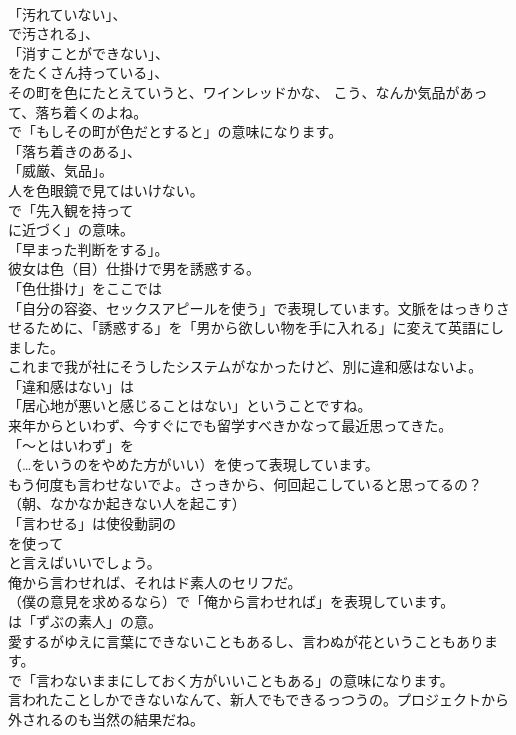 \documentclass[8pt]{extreport}
\begin{document}
\begin{CJK}{UTF8}{min}
\\	「汚れていない」、
\\	で汚される」、
\\	「消すことができない」、
\\	をたくさん持っている」、
\\	その町を色にたとえていうと、ワインレッドかな、 こう、なんか気品があって、落ち着くのよね。 
\\	で「もしその町が色だとすると」の意味になります。
\\	「落ち着きのある」、
\\	「威厳、気品」。	
\\	人を色眼鏡で見てはいけない。 
\\	で「先入観を持って 
\\	に近づく」の意味。
\\	「早まった判断をする」。	
\\	彼女は色（目）仕掛けで男を誘惑する。 
\\	「色仕掛け」をここでは
\\	「自分の容姿、セックスアピールを使う」で表現しています。文脈をはっきりさせるために、「誘惑する」を「男から欲しい物を手に入れる」に変えて英語にしました。	
\\	これまで我が社にそうしたシステムがなかったけど、別に違和感はないよ。 
\\	「違和感はない」は
\\	「居心地が悪いと感じることはない」ということですね。	
\\	来年からといわず、今すぐにでも留学すべきかなって最近思ってきた。 
\\	「～とはいわず」を
\\	（…をいうのをやめた方がいい）を使って表現しています。	
\\	もう何度も言わせないでよ。さっきから、何回起こしていると思ってるの？（朝、なかなか起きない人を起こす） 
\\	「言わせる」は使役動詞の
\\	を使って
\\	と言えばいいでしょう。	
\\	俺から言わせれば、それはド素人のセリフだ。 
\\	（僕の意見を求めるなら）で「俺から言わせれば」を表現しています。
\\	は「ずぶの素人」の意。	
\\	愛するがゆえに言葉にできないこともあるし、言わぬが花ということもあります。 
\\	で「言わないままにしておく方がいいこともある」の意味になります。	
\\	言われたことしかできないなんて、新人でもできるっつうの。プロジェクトから外されるのも当然の結果だね。 

\end{CJK}
\end{document}
